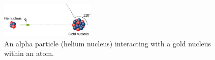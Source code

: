 \documentclass{article}
\begin{document}
\begin{figure}
\centering
\includegraphics[width=0.4\textwidth]{figures/nuclei.jpeg}
\caption{\label{fig:1} An alpha particle (helium nucleus) interacting with a gold nucleus within an atom.}
\end{figure}
\end{document}
